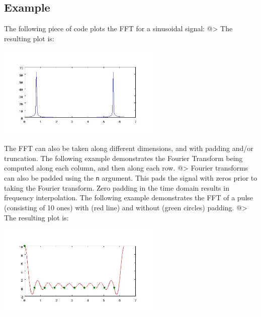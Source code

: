 \subsection{Example}

The following piece of code plots the FFT for a sinusoidal signal:
@>
The resulting plot is:


\centerline{\includegraphics[width=8cm]{fft1}}


The FFT can also be taken along different dimensions, and with padding 
and/or truncation.  The following example demonstrates the Fourier
Transform being computed along each column, and then along each row.
@>
Fourier transforms can also be padded using the \verb|n| argument.  This
pads the signal with zeros prior to taking the Fourier transform.  Zero
padding in the time domain results in frequency interpolation.  The
following example demonstrates the FFT of a pulse (consisting of 10 ones)
with (red line) and without (green circles) padding.
@>
The resulting plot is:


\centerline{\includegraphics[width=8cm]{fft2}}

